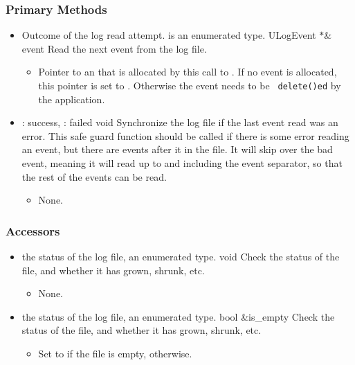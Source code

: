 \subsubsection{Primary Methods}
\begin{itemize}

\item {}
  {}
  {Outcome of the log read attempt.  is an enumerated
  type.}
  {ULogEvent $*$\& event}
  {Read the next event from the log file.}
  \begin{itemize}
  \item {}
    Pointer to an  that is allocated by this call to
    .
    If no event is allocated, this pointer is
    set to .  Otherwise the event needs to be {\tt
    delete()ed} by the application.
  \end{itemize}

\item {}
  {} {: success, : failed}
  {void}
  {Synchronize the log file if the last event read was an error.  This
    safe guard function should be called if there is some error reading an
    event, but there are events after it in the file.
    It will skip over the
    bad event, meaning it will read up to and including the event separator,
    so that the rest of the events can be read.}
  \begin{itemize}\item None. \end{itemize}

\end{itemize}

\subsubsection{Accessors}
\begin{itemize}

\item {}
  {}{the status of the log file, an
  enumerated type.}
  {void}
  {Check the status of the file, and whether it has grown, shrunk, etc.}
  \begin{itemize}\item None. \end{itemize}

\item {}
  {} {the status of the log file, an
  enumerated type.}
  {bool \&is\_empty}
  {Check the status of the file, and whether it has grown, shrunk, etc.}
  \begin{itemize}
  \item {}
    Set to  if the file is empty,  otherwise.
  \end{itemize}

\end{itemize}


